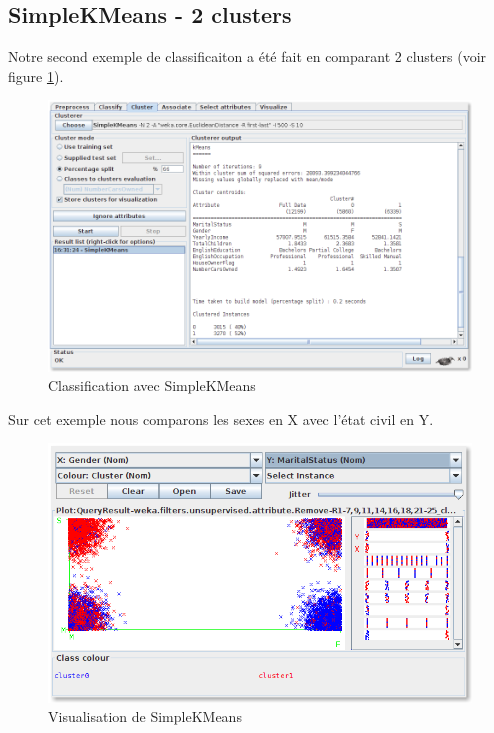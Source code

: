 \subsection*{SimpleKMeans - 2 clusters}

    Notre second exemple de classificaiton a été fait en comparant 2 clusters (voir figure \ref{kmeans2}).

    \begin{figure}[H]
        \centering
        \includegraphics[width=1\linewidth, fbox]{img/clustering/kmeans_2.png}
        \caption{Classification avec SimpleKMeans}
        \label{kmeans2}
    \end{figure}

    Sur cet exemple nous comparons les sexes en X avec l'état civil en Y.

    \begin{figure}[H]
        \centering
        \includegraphics[width=1\linewidth, fbox]{img/clustering/kmeans_2_viz.png}
        \caption{Visualisation de SimpleKMeans}
        \label{kmeans2viz}
    \end{figure}

